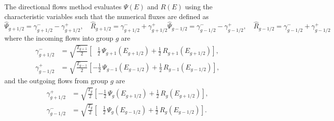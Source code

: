 The directional flows method evaluates $\Psi(E)$ and $R(E)$ using the characteristic variables such that the numerical fluxes are defined as
\begin{subequations}
    \begin{equation}
        \hat{\Psi}_{g+1/2} = \gamma_{g+1/2}^- - \gamma_{g+1/2}^+, \quad \hat{R}_{g+1/2} = \gamma_{g+1/2}^- + \gamma_{g+1/2}^+
    \end{equation}
    \begin{equation}
        \hat{\Psi}_{g-1/2} = \gamma_{g-1/2}^- - \gamma_{g-1/2}^+, \quad \hat{R}_{g-1/2} = \gamma_{g-1/2}^- + \gamma_{g-1/2}^+
    \end{equation}
\end{subequations}
where the incoming flows into group $g$ are
\begin{subequations}
    \begin{align}
        \gamma_{g+1/2}^- &= \sqrt{\frac{T_{g+1}}{2}} \left[\,\,\,\,\frac{1}{2} \, \Psi_{g+1}(E_{g+1/2}) + \frac{1}{2} \, R_{g+1}(E_{g+1/2}) \right], \\
        \gamma_{g-1/2}^+ &= \sqrt{\frac{T_{g-1}}{2}} \left[-\frac{1}{2} \, \Psi_{g-1}(E_{g-1/2}) + \frac{1}{2} \, R_{g-1}(E_{g-1/2}) \right],
    \end{align}
\end{subequations}
and the outgoing flows from group $g$ are
\begin{subequations}
    \begin{align}
        \gamma_{g+1/2}^+ &= \sqrt{\frac{T_g}{2}} \left[-\frac{1}{2} \, \Psi_{g}(E_{g+1/2}) + \frac{1}{2} \, R_{g}(E_{g+1/2}) \right], \\
        \gamma_{g-1/2}^- &= \sqrt{\frac{T_g}{2}} \left[\,\,\,\,\frac{1}{2} \, \Psi_{g}(E_{g-1/2}) + \frac{1}{2} \, R_{g}(E_{g-1/2}) \right].
    \end{align}
\end{subequations}